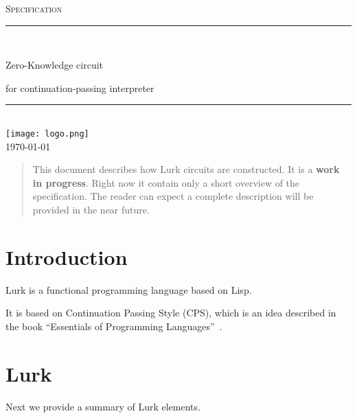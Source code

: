 \documentclass[10pt, english]{article}
\begin{document}
\begin{titlepage}
	\newcommand{\HRule}{\rule{\linewidth}{0.5mm}}

	\clearpage\thispagestyle{empty}
	\centering
	\vspace{1cm}

	\textsc{\Large Specification}\\[.5cm]
	\HRule\\[.5cm]
	{\Huge Zero-Knowledge circuit \par}
	\vspace{.5cm}
	{\Large for continuation-passing interpreter \par}
	\vspace{.5cm}
	\HRule \\[.5cm]


\texttt{[image: logo.png]}\\[.1cm]
	{\large \today}\\[2cm]
\vfill
\end{titlepage}


\begin{abstract}
  This document describes how Lurk circuits are constructed. It is a \textbf{work in progress}.
  Right now it contain only a short overview of the specification. The reader can expect a complete description will be provided in the near future.
\end{abstract}

\tableofcontents

\newpage

\section{Introduction}

Lurk is a functional programming language based on Lisp.

It is based on Continuation Passing Style (CPS), which is an idea described in the book ``Essentials of Programming Languages''~\cite{FWbook}.

\section{Lurk}

Next we provide a summary of Lurk elements.

\end{document}
